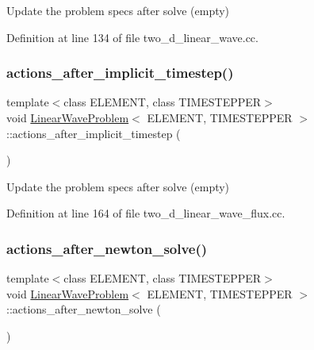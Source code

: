 Update the problem specs after solve (empty) 



Definition at line 134 of file two\+\_\+d\+\_\+linear\+\_\+wave.\+cc.

\mbox{\label{classLinearWaveProblem_a521290f43f9aac37c9604e744fa71075}} 
\subsubsection{\texorpdfstring{actions\+\_\+after\+\_\+implicit\+\_\+timestep()}{actions\_after\_implicit\_timestep()}\hspace{0.1cm}{\footnotesize\ttfamily [2/2]}}
{\footnotesize\ttfamily template$<$class E\+L\+E\+M\+E\+NT, class T\+I\+M\+E\+S\+T\+E\+P\+P\+ER$>$ \\
void \hyperlink{classLinearWaveProblem}{Linear\+Wave\+Problem}$<$ E\+L\+E\+M\+E\+NT, T\+I\+M\+E\+S\+T\+E\+P\+P\+ER $>$\+::actions\+\_\+after\+\_\+implicit\+\_\+timestep (\begin{DoxyParamCaption}{ }\end{DoxyParamCaption})\hspace{0.3cm}{\ttfamily [inline]}}



Update the problem specs after solve (empty) 



Definition at line 164 of file two\+\_\+d\+\_\+linear\+\_\+wave\+\_\+flux.\+cc.

\mbox{\label{classLinearWaveProblem_a5b45c619af141b19162f990a95490e80}} 
\subsubsection{\texorpdfstring{actions\+\_\+after\+\_\+newton\+\_\+solve()}{actions\_after\_newton\_solve()}\hspace{0.1cm}{\footnotesize\ttfamily [1/2]}}
{\footnotesize\ttfamily template$<$class E\+L\+E\+M\+E\+NT, class T\+I\+M\+E\+S\+T\+E\+P\+P\+ER$>$ \\
void \hyperlink{classLinearWaveProblem}{Linear\+Wave\+Problem}$<$ E\+L\+E\+M\+E\+NT, T\+I\+M\+E\+S\+T\+E\+P\+P\+ER $>$\+::actions\+\_\+after\+\_\+newton\+\_\+solve (\begin{DoxyParamCaption}{ }\end{DoxyParamCaption})\hspace{0.3cm}{\ttfamily [inline]}}



